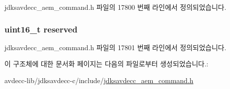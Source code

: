 jdksavdecc\+\_\+aem\+\_\+command.\+h 파일의 17800 번째 라인에서 정의되었습니다.

\subsubsection[{\texorpdfstring{reserved}{reserved}}]{\setlength{\rightskip}{0pt plus 5cm}uint16\+\_\+t reserved}\hypertarget{structjdksavdecc__aem__command__increment__control_a5a6ed8c04a3db86066924b1a1bf4dad3}{}\label{structjdksavdecc__aem__command__increment__control_a5a6ed8c04a3db86066924b1a1bf4dad3}


jdksavdecc\+\_\+aem\+\_\+command.\+h 파일의 17801 번째 라인에서 정의되었습니다.



이 구조체에 대한 문서화 페이지는 다음의 파일로부터 생성되었습니다.\+:\begin{DoxyCompactItemize}
\item 
avdecc-\/lib/jdksavdecc-\/c/include/\hyperlink{jdksavdecc__aem__command_8h}{jdksavdecc\+\_\+aem\+\_\+command.\+h}\end{DoxyCompactItemize}
